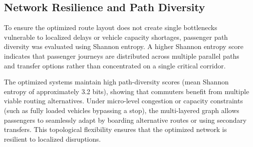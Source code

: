 \subsection{Network Resilience and Path Diversity}
To ensure the optimized route layout does not create single bottlenecks vulnerable to localized delays or vehicle capacity shortages, passenger path diversity was evaluated using Shannon entropy. A higher Shannon entropy score indicates that passenger journeys are distributed across multiple parallel paths and transfer options rather than concentrated on a single critical corridor.

The optimized systems maintain high path-diversity scores (mean Shannon entropy of approximately 3.2 bits), showing that commuters benefit from multiple viable routing alternatives. Under micro-level congestion or capacity constraints (such as fully loaded vehicles bypassing a stop), the multi-layered graph allows passengers to seamlessly adapt by boarding alternative routes or using secondary transfers. This topological flexibility ensures that the optimized network is resilient to localized disruptions.
